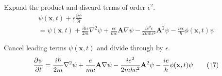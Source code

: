 \documentclass[12pt]{article}
\begin{document}
Expand the product and discard terms of order $\epsilon^2$.
\begin{multline*}
\psi(\mathbf x,t)+\epsilon\frac{\partial\psi}{\partial t}
\\
{}=
\psi(\mathbf x,t)
+\frac{i\hbar\epsilon}{2m}\nabla^2\psi
+\frac{e\epsilon}{mc}\mathbf A\nabla\psi
-\frac{ie^2\epsilon}{2m\hbar c^2}\mathbf A^2\psi
-\frac{ie\epsilon}{\hbar}\phi(\mathbf x,t)\psi
\end{multline*}

Cancel leading terms $\psi(\mathbf x,t)$ and divide through by $\epsilon$.
\begin{equation*}
\frac{\partial\psi}{\partial t}
\\
{}=
\frac{i\hbar}{2m}\nabla^2\psi
+\frac{e}{mc}\mathbf A\nabla\psi
-\frac{ie^2}{2m\hbar c^2}\mathbf A^2\psi
-\frac{ie}{\hbar}\phi(\mathbf x,t)\psi
\tag{17}
\end{equation*}
\end{document}
